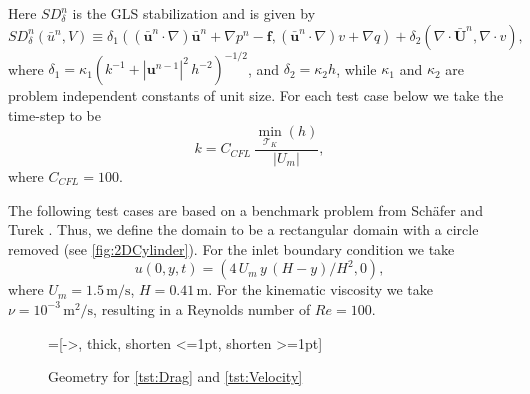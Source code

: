 Here $SD_{\delta}^n$ is the GLS stabilization and is given by
\begin{equation}
    SD_{\delta}^n(\bar{u}^n, V) \equiv
    \delta_1 (\left(\bar{\mathbf{u}}^n \cdot \nabla \right) \bar{\mathbf{u}}^n
        + \nabla p^n - \mathbf{f},
      \left(\bar{\mathbf{u}}^n \cdot \nabla \right) v + \nabla q)
      + \delta_2 (\nabla \cdot \bar{\mathbf{U}}^n, \nabla \cdot v),
  \label{eqn:NSEStabilization}
\end{equation}
where $\delta_1 = \kappa_1 (k^{-1} + |\mathbf{u}^{n-1}|^2\, h^{-2})^{-1/2}$, and
$\delta_2 = \kappa_2 h$, while $\kappa_1$ and $\kappa_2$ are problem independent
constants of unit size. For each test case below we take the time-step to be
\begin{equation*}
  k = C_{CFL}\, \frac{\min_{\mathcal{T}_K}(h)}{|U_m|},
\end{equation*}
where $C_{CFL}=100$.

The following test cases are based on a benchmark problem from Sch\"afer and
Turek \cite[Test case 2D-2]{Schaefer1996}. Thus, we define the domain to be a
rectangular domain with a circle removed (see \autoref{fig:2DCylinder}). For the
inlet boundary condition we take
\begin{equation}
    u(0,y,t) = (4\, U_m\,y\, (H - y)/H^2, 0),
    \label{eqn:2DInlet}
\end{equation}
where $U_m = 1.5\, \text{m/s}$, $H = 0.41\, \text{m}$. For the kinematic
viscosity we take $\nu = 10^{-3}\, \text{m}^2\text{/s}$, resulting in a
Reynolds number of $Re=100$.

\begin{figure}[h]
    \centering
    =[->, thick, shorten <=1pt, shorten >=1pt]
    \caption{Geometry for \autoref{tst:Drag} and \autoref{tst:Velocity}}
    \label{fig:2DCylinder}
\end{figure}

